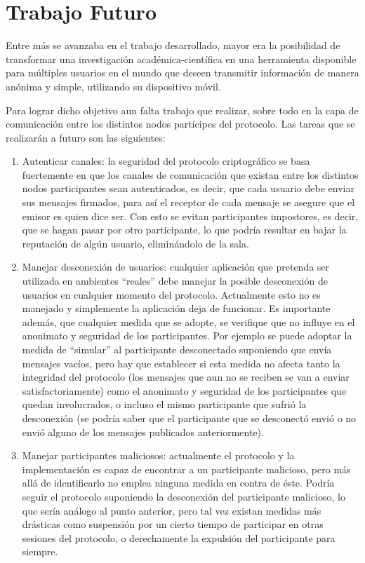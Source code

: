 \chapter{Trabajo Futuro}

Entre más se avanzaba en el trabajo desarrollado, mayor era la posibilidad de transformar
una investigación académica-científica en una herramienta disponible para múltiples
usuarios en el mundo que deseen transmitir información de manera anónima y simple, 
utilizando su dispositivo móvil.

Para lograr dicho objetivo aun falta trabajo que realizar, sobre todo en la capa de
comunicación entre los distintos nodos partícipes del protocolo. Las tareas que se
realizarán a futuro son las siguientes:

\begin{enumerate}
    \item Autenticar canales: la seguridad del protocolo criptográfico se basa fuertemente
    en que los canales de comunicación que existan entre los distintos nodos participantes
    sean autenticados, es decir, que cada usuario debe enviar sus mensajes firmados, para
    así el receptor de cada mensaje se asegure que el emisor es quien dice ser. Con esto
    se evitan participantes impostores, es decir, que se hagan pasar por otro 
    participante, lo que podría resultar en bajar la reputación de algún usuario,
    eliminándolo de la sala.
    
    \item Manejar desconexión de usuarios: cualquier aplicación que pretenda ser utilizada
    en ambientes ``reales'' debe manejar la posible desconexión de usuarios en cualquier 
    momento del protocolo. Actualmente esto no es manejado y simplemente la aplicación 
    deja de funcionar. Es importante además, que cualquier medida que se adopte, se 
    verifique que no influye en el anonimato y seguridad de los participantes. Por 
    ejemplo se puede adoptar la medida de ``simular'' al participante desconectado 
    suponiendo que envía mensajes vacíos, pero hay que establecer si esta medida no 
    afecta tanto la integridad del protocolo (los mensajes que aun no se reciben 
    se van a enviar satisfactoriamente) como el anonimato y seguridad de los 
    participantes que quedan involucrados, o incluso el mismo participante que sufrió 
    la desconexión (se podría saber que el participante que se desconectó envió o no 
    envió alguno de los mensajes publicados anteriormente).
    
    \item Manejar participantes maliciosos: actualmente el protocolo y la implementación 
    es capaz de encontrar a un participante malicioso, pero más allá de identificarlo 
    no emplea ninguna medida en contra de éste. Podría seguir el protocolo suponiendo 
    la desconexión del participante malicioso, lo que sería análogo al punto anterior, 
    pero tal vez existan medidas más drásticas como suspensión por un cierto tiempo 
    de participar en otras sesiones del protocolo, o derechamente la expulsión del 
    participante para siempre. 
    

\end{enumerate}
